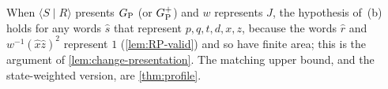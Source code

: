 When $\langle S\mid R\rangle$ presents $G_{\mathrm P}$ (or $G_{\mathrm P}^{+}$) and $w$ represents $J$, the hypothesis of~(b) holds for any words $\hat s$ that
represent $p,q,t,d,x,z$, because the words $\hat r$ and $w^{-1}(\hat x\hat z)^2$ represent $1$ (\cref{lem:RP-valid}) and so have finite area; this is the
argument of \cref{lem:change-presentation}. The matching upper bound, and the state-weighted version, are \cref{thm:profile}.
